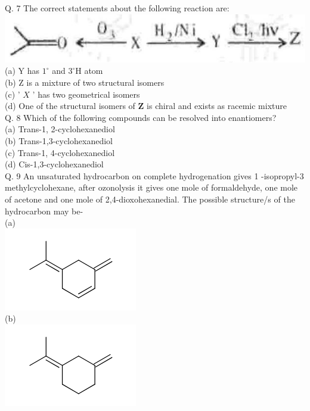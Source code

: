 \documentclass[10pt]{article}
\begin{document}
Q. 7 The correct statements about the following reaction are:\\
\includegraphics[max width=\textwidth, center]{2025_01_28_8470952b98110cec3aabg-146}\\
(a) Y has $1^{\circ}$ and $3^{\circ} \mathrm{H}$ atom\\
(b) Z is a mixture of two structural isomers\\
(c) ' $X$ ' has two geometrical isomers\\
(d) One of the structural isomers of $\mathbf{Z}$ is chiral and exists as racemic mixture\\
Q. 8 Which of the following compounds can be resolved into enantiomers?\\
(a) Trans-1, 2-cyclohexanediol\\
(b) Trans-1,3-cyclohexanediol\\
(c) Trans-1, 4-cyclohexanediol\\
(d) Cis-1,3-cyclohexanediol\\
Q. 9 An unsaturated hydrocarbon on complete hydrogenation gives 1 -isopropyl-3 methylcyclohexane, after ozonolysis it gives one mole of formaldehyde, one mole of acetone and one mole of 2,4-dioxohexanedial. The possible structure/s of the hydrocarbon may be-\\
(a)\\
\includegraphics{smile-d6a12d9ca5ac38c0e7d359d8000213a35685085d}\\
(b)\\
\includegraphics{smile-068716b0506fec26ef4358be27bb889ab93a6a6a}\\
\end{document}
